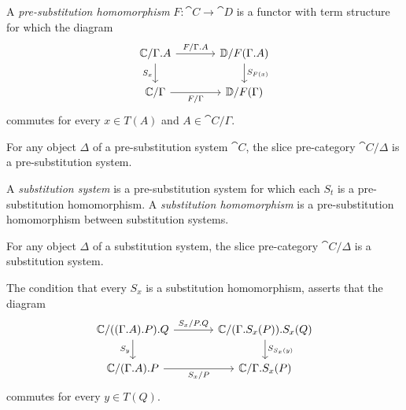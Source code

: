 \begin{defn}
A \emph{pre-substitution homomorphism} $F:\cat{C}\to\cat{D}$ is a functor with term structure for
which the diagram
\begin{equation*}
\begin{tikzcd}[column sep=large]
\cat{C}/\ctxext{\Gamma}{A}
  \arrow[r,"F/\ctxext{\Gamma}{A}"]
  \arrow[d,swap,"S_x"]
  &
\cat{D}/F(\ctxext{\Gamma}{A})
  \arrow[d,"S_{F(x)}"]
  \\
\cat{C}/\Gamma
  \arrow[r,swap,"F/\Gamma"]
  &
\cat{D}/F(\Gamma)
\end{tikzcd}
\end{equation*}
commutes for every $x\in T(A)$ and $A\in\cat{C}/\Gamma$.
\end{defn}

\begin{lem}
For any object $\Delta$ of a pre-substitution system $\cat{C}$, the slice pre-category
$\cat{C}/\Delta$ is a pre-substitution system.
\end{lem}

\begin{defn}
A \emph{substitution system} is a pre-substitution system for which each
$S_t$ is a pre-substitution homomorphism. A \emph{substitution homomorphism} is a
pre-substitution homomorphism between substitution systems.
\end{defn}

\begin{cor}
For any object $\Delta$ of a substitution system, the slice pre-category $\cat{C}/\Delta$
is a substitution system.
\end{cor}

\begin{rmk}
The condition that every $S_x$ is a substitution homomorphism, asserts that
the diagram
\begin{equation*}
\begin{tikzcd}[column sep=large]
\cat{C}/\ctxext{{{\Gamma}{A}}{P}}{Q}
  \arrow[r,"S_x/\ctxext{P}{Q}"]
  \arrow[d,swap,"S_y"]
  &
\cat{C}/\ctxext{{\Gamma}{S_x(P)}}{S_x(Q)}
  \arrow[d,"S_{S_x(y)}"]
  \\
\cat{C}/\ctxext{{\Gamma}{A}}{P}
  \arrow[r,swap,"S_x/P"]
  &
\cat{C}/\ctxext{\Gamma}{S_x(P)}
\end{tikzcd}
\end{equation*}
commutes for every $y\in T(Q)$.
\end{rmk}

